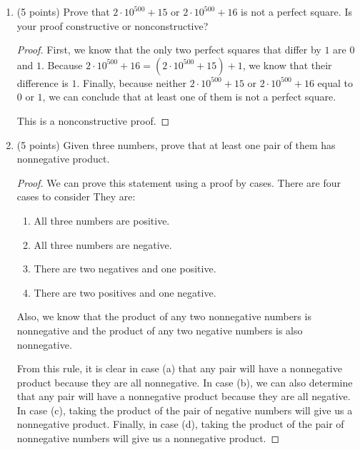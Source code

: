 \documentclass[11pt]{article}
\begin{document}
\begin{enumerate}
\begin{proof}
Therefore, in all possible cases, we can see that $min(a,min(b,c))=min(min(a,b),c)$.  

\end{proof}

\item (5 points) Prove that $2\cdot 10^{500}+15$ or $2\cdot 10^{500}+16$ is not a perfect square.
	Is your proof constructive or nonconstructive?

\begin{proof}

First, we know that the only two perfect squares that differ by $1$ are $0$ and $1$.  Because $2\cdot 10^{500}+16 = (2\cdot 10^{500}+15) + 1$, we know that their difference is $1$.  Finally, because neither $2\cdot 10^{500}+15$ or $2\cdot 10^{500}+16$ equal to $0$ or $1$, we can conclude that at least one of them is not a perfect square.  

This is a nonconstructive proof.  

\end{proof}

\newpage
\item (5 points) 
Given three numbers, prove that at least one pair of them has 
nonnegative product.

\begin{proof}

We can prove this statement using a proof by cases.  There are four cases to consider  They are:
\begin{enumerate}
\item All three numbers are positive.
\item All three numbers are negative.
\item There are two negatives and one positive.  
\item There are two positives and one negative.  
\end{enumerate}

Also, we know that the product of any two nonnegative numbers is nonnegative and the product of any two negative numbers is also nonnegative.  

From this rule, it is clear in case (a) that any pair will have a nonnegative product because they are all nonnegative.
In case (b), we can also determine that any pair will have a nonnegative product because they are all negative.
In case (c), taking the product of the pair of negative numbers will give us a nonnegative product.  
Finally, in case (d), taking the product of the pair of nonnegative numbers will give us a nonnegative product.  


\end{proof}
\end{enumerate}
\end{document}
